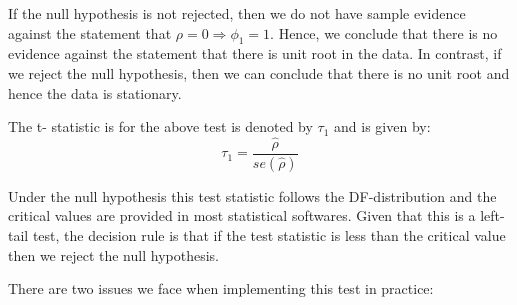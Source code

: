 \documentclass[]{book}
\theoremstyle{definition}
\theoremstyle{definition}
\theoremstyle{definition}
\theoremstyle{remark}
\begin{document}
If the null hypothesis is not rejected, then we do not have sample evidence against the statement that \(\rho=0 \Rightarrow \phi_1=1\). Hence, we conclude that there is no evidence against the statement that there is unit root in the data. In contrast, if we reject the null hypothesis, then we can conclude that there is no unit root and hence the data is stationary.

The t- statistic is for the above test is denoted by \(\tau_1\) and is given by:
\[\tau_1 =\frac{\hat{\rho}}{se(\hat{\rho})}\]

Under the null hypothesis this test statistic follows the DF-distribution and the critical values are provided in most statistical softwares. Given that this is a left-tail test, the decision rule is that if the test statistic is less than the critical value then we reject the null hypothesis.

There are two issues we face when implementing this test in practice:
\end{document}
